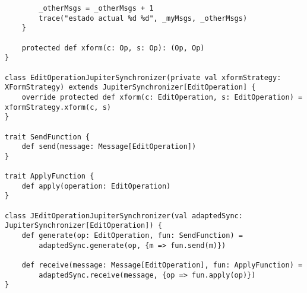 {\begin{verbatim}
        _otherMsgs = _otherMsgs + 1
        trace("estado actual %d %d", _myMsgs, _otherMsgs)
    }

    protected def xform(c: Op, s: Op): (Op, Op)
}

class EditOperationJupiterSynchronizer(private val xformStrategy: XFormStrategy) extends JupiterSynchronizer[EditOperation] {
    override protected def xform(c: EditOperation, s: EditOperation) = xformStrategy.xform(c, s)
}

trait SendFunction {
    def send(message: Message[EditOperation])
}

trait ApplyFunction {
    def apply(operation: EditOperation)
}

class JEditOperationJupiterSynchronizer(val adaptedSync: JupiterSynchronizer[EditOperation]) {
    def generate(op: EditOperation, fun: SendFunction) =
        adaptedSync.generate(op, {m => fun.send(m)})

    def receive(message: Message[EditOperation], fun: ApplyFunction) =
        adaptedSync.receive(message, {op => fun.apply(op)})
}
\end{verbatim}
}